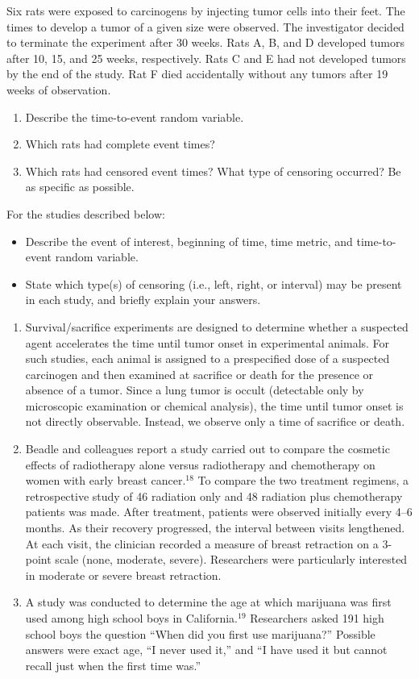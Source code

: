 \documentclass[
]{report}
\begin{document}
\begin{list}{E.}{ \setlength{\itemsep}{1.2em}}
  \item Six rats were exposed to carcinogens by injecting tumor cells into their feet. The times to develop a tumor of a given size were observed. The investigator decided to terminate the experiment after 30 weeks. Rats A, B, and D developed tumors after 10, 15, and 25 weeks, respectively. Rats C and E had not developed tumors by the end of the study. Rat F died accidentally without any tumors after 19 weeks of observation.
  \begin{enumerate}
    \item Describe the time-to-event random variable.
    \item Which rats had complete event times?
    \item Which rats had censored event times? What type of censoring occurred? Be as specific as possible.
  \end{enumerate}

  \item For the studies described below:
  \begin{itemize}
    \item Describe the event of interest, beginning of time, time metric, and time-to-event random variable.
    \item State which type(s) of censoring (i.e., left, right, or interval) may be present in each study, and briefly explain your answers.
  \end{itemize}
  \begin{enumerate}
    \item Survival/sacrifice experiments are designed to determine whether a suspected agent accelerates the time until tumor onset in experimental animals. For such studies, each animal is assigned to a prespecified dose of a suspected carcinogen and then examined at sacrifice or death for the presence or absence of a tumor. Since a lung tumor is occult (detectable only by microscopic examination or chemical analysis), the time until tumor onset is not directly observable. Instead, we observe only a time of sacrifice or death.
    \item Beadle and colleagues report a study carried out to compare the cosmetic effects of radiotherapy alone versus radiotherapy and chemotherapy on women with early breast cancer.$^{18}$ To compare the two treatment regimens, a retrospective study of 46 radiation only and 48 radiation plus chemotherapy patients was made. After treatment, patients were observed initially every 4–6 months. As their recovery progressed, the interval between visits lengthened. At each visit, the clinician recorded a measure of breast retraction on a 3-point scale (none, moderate, severe). Researchers were particularly interested in moderate or severe breast retraction.
    \item A study was conducted to determine the age at which marijuana was first used among high school boys in California.$^{19}$ Researchers asked 191 high school boys the question ``When did you first use marijuana?'' Possible answers were exact age, ``I never used it,'' and ``I have used it but cannot recall just when the first time was.''
  \end{enumerate}


\end{list}
\end{document}
